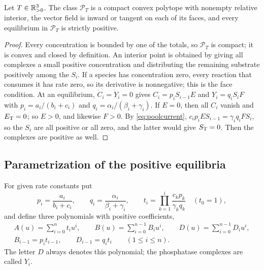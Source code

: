 \begin{lemma}\label{lem:boundary}
Let \(T\in\mathbb R^3_{>0}\). The class \(\mathcal P_T\) is a compact convex polytope with nonempty
relative interior, the vector field is inward or tangent on each of its faces, and every
equilibrium in \(\mathcal P_T\) is strictly positive.
\end{lemma}
\begin{proof}
Every concentration is bounded by one of the totals, so \(\mathcal P_T\) is compact; it is
convex and closed by definition. An interior point is obtained by giving all complexes a small
positive concentration and distributing the remaining substrate positively among the \(S_i\).
If a species has concentration zero, every reaction that consumes it has rate zero, so its
derivative is nonnegative; this is the face condition. At an equilibrium,
\(\dot C_i=\dot Y_i=0\) gives \(C_i=p_iS_{i-1}E\) and \(Y_i=q_iS_iF\) with
\(p_i=a_i/(b_i+c_i)\) and \(q_i=\alpha_i/(\beta_i+\gamma_i)\). If \(E=0\), then all \(C_i\)
vanish and \(E_{\mathrm T}=0\); so \(E>0\), and likewise \(F>0\). By \eqref{eq:poolcurrent},
\(c_ip_iES_{i-1}=\gamma_iq_iFS_i\), so the \(S_i\) are all positive or all zero, and the latter
would give \(S_{\mathrm T}=0\). Then the complexes are positive as well.
\end{proof}

\subsection{Parametrization of the positive equilibria}
For given rate constants put
\begin{equation}\label{eq:pq}
 p_i=\frac{a_i}{b_i+c_i},\qquad q_i=\frac{\alpha_i}{\beta_i+\gamma_i},\qquad
 t_i=\prod_{k=1}^{i}\frac{c_kp_k}{\gamma_kq_k}\quad(t_0=1),
\end{equation}
and define three polynomials with positive coefficients,
\begin{equation}\label{eq:coeff}
\begin{gathered}
 A(u)=\sum_{i=0}^n t_i u^i,\qquad
 B(u)=\sum_{i=0}^{n-1} B_i u^i,\qquad
 D(u)=\sum_{i=0}^{n-1} D_i u^i,\\
 B_{i-1}=p_it_{i-1},\qquad D_{i-1}=q_it_i\qquad(1\le i\le n).
\end{gathered}
\end{equation}
The letter \(D\) always denotes this polynomial; the phosphatase complexes are called \(Y_i\).


